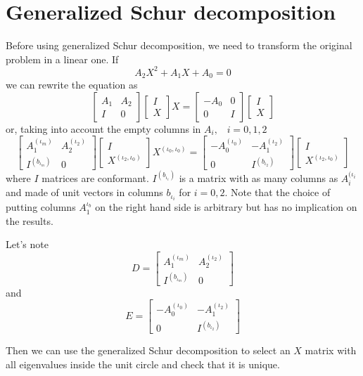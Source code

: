 \documentclass{article}
\begin{document}
\section{Generalized Schur decomposition}
Before using generalized Schur decomposition, we need to transform the
original problem in a linear one. If
\[
  A_2X^2 + A_1X + A_0 =0
\]
we can rewrite the equation as
\[
  \begin{bmatrix}
    A_1 & A_2\\
    I & 0
  \end{bmatrix}
  \begin{bmatrix}
    I \\
    X
  \end{bmatrix}
  X
  =
  \begin{bmatrix} 
    -A_0 & 0\\
    0 & I
  \end{bmatrix}
  \begin{bmatrix}
    I \\
    X
  \end{bmatrix}
\]
or, taking into account the empty columns in $A_i,\;\;\; i=0,1,2$
\[
  \begin{bmatrix}
    A^{(\iota_m)}_1 & A^{(\iota_2)}_2\\
    I^{(b_{\iota_m})} & 0
  \end{bmatrix}
  \begin{bmatrix}
    I \\
    X^{(\iota_2,\iota_0)}
  \end{bmatrix}
  X^{(\iota_0,\iota_0)}
  =
  \begin{bmatrix} 
    -A^{(\iota_0)}_0 & -A^{(\iota_2)}_1\\
    0 & I^{(b_{\iota_2})}
  \end{bmatrix}
  \begin{bmatrix}
    I \\
    X^{(\iota_2,\iota_0)}
  \end{bmatrix}
\]
where $I$ matrices are conformant. $I^{(b_{\iota_i})}$ is a matrix
with as many columns as $A^{(\iota_i}_i$ and made of unit vectors in
columns $b_{\iota_i}$ for $i=0,2$. Note that the choice of putting
columns $A^{\iota_b}_1$ on the right hand side is arbitrary but has no
implication on the results.

Let's note
\[
  D = 
  \begin{bmatrix}
    A^{(\iota_m)}_1 & A^{(\iota_2)}_2\\
    I^{(b_{\iota_m})} & 0
  \end{bmatrix}
\]
and
\[
  E =
  \begin{bmatrix} 
    -A^{(\iota_0)}_0 & -A^{(\iota_2)}_1\\
    0 & I^{(b_{\iota_2})}
  \end{bmatrix}
\]  

Then we can use the generalized Schur decomposition to select an $X$
matrix with all eigenvalues inside the unit circle and check that it
is unique.
\end{document}
